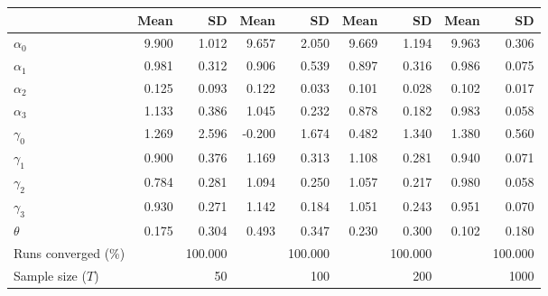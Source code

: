 
\begin{tabular}[t]{lrrrrrrrr}
\toprule
  & Mean & SD & Mean  & SD  & Mean   & SD   & Mean    & SD   \\
\midrule
$\alpha_{0}$ & 9.900 & 1.012 & 9.657 & 2.050 & 9.669 & 1.194 & 9.963 & 0.306\\
$\alpha_{1}$ & 0.981 & 0.312 & 0.906 & 0.539 & 0.897 & 0.316 & 0.986 & 0.075\\
$\alpha_{2}$ & 0.125 & 0.093 & 0.122 & 0.033 & 0.101 & 0.028 & 0.102 & 0.017\\
$\alpha_{3}$ & 1.133 & 0.386 & 1.045 & 0.232 & 0.878 & 0.182 & 0.983 & 0.058\\
$\gamma_{0}$ & 1.269 & 2.596 & -0.200 & 1.674 & 0.482 & 1.340 & 1.380 & 0.560\\
$\gamma_{1}$ & 0.900 & 0.376 & 1.169 & 0.313 & 1.108 & 0.281 & 0.940 & 0.071\\
$\gamma_{2}$ & 0.784 & 0.281 & 1.094 & 0.250 & 1.057 & 0.217 & 0.980 & 0.058\\
$\gamma_{3}$ & 0.930 & 0.271 & 1.142 & 0.184 & 1.051 & 0.243 & 0.951 & 0.070\\
$\theta$ & 0.175 & 0.304 & 0.493 & 0.347 & 0.230 & 0.300 & 0.102 & 0.180\\
Runs converged (\%) &  & 100.000 &  & 100.000 &  & 100.000 &  & 100.000\\
Sample size ($T$) &  & 50 &  & 100 &  & 200 &  & 1000\\
\bottomrule
\end{tabular}

